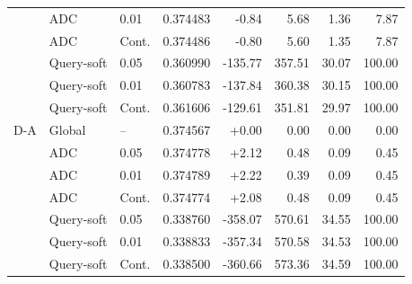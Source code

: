 \begin{table}[htbp]
\begin{tabular}{lllrrrrr}
 & ADC & 0.01 & 0.374483 & -0.84 & 5.68 & 1.36 & 7.87\\
 & ADC & Cont. & 0.374486 & -0.80 & 5.60 & 1.35 & 7.87\\
 & Query-soft & 0.05 & 0.360990 & -135.77 & 357.51 & 30.07 & 100.00\\
 & Query-soft & 0.01 & 0.360783 & -137.84 & 360.38 & 30.15 & 100.00\\
 & Query-soft & Cont. & 0.361606 & -129.61 & 351.81 & 29.97 & 100.00\\
\midrule
D-A & Global & -- & 0.374567 & +0.00 & 0.00 & 0.00 & 0.00\\
 & ADC & 0.05 & 0.374778 & +2.12 & 0.48 & 0.09 & 0.45\\
 & ADC & 0.01 & 0.374789 & +2.22 & 0.39 & 0.09 & 0.45\\
 & ADC & Cont. & 0.374774 & +2.08 & 0.48 & 0.09 & 0.45\\
 & Query-soft & 0.05 & 0.338760 & -358.07 & 570.61 & 34.55 & 100.00\\
 & Query-soft & 0.01 & 0.338833 & -357.34 & 570.58 & 34.53 & 100.00\\
 & Query-soft & Cont. & 0.338500 & -360.66 & 573.36 & 34.59 & 100.00\\
\bottomrule
\end{tabular}
\end{table}
